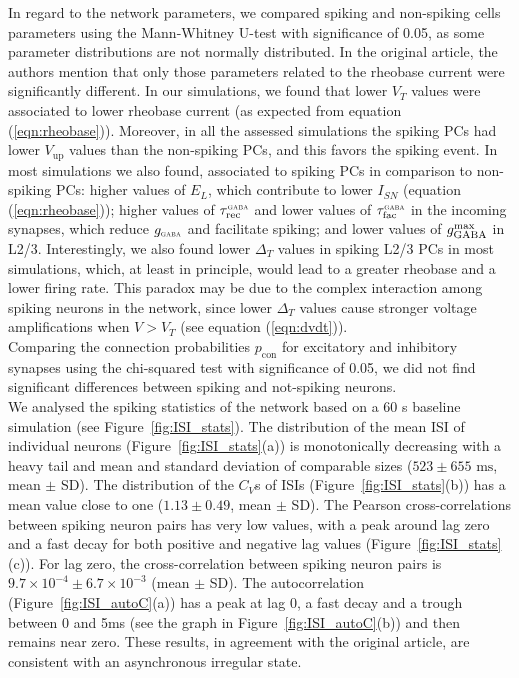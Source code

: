 In regard to the network parameters, we compared spiking and non-spiking cells parameters using the Mann-Whitney U-test with significance of 0.05, as some parameter distributions are not normally distributed. In the original article, the authors mention that only those parameters related to the rheobase current were significantly different. In our simulations, we found that lower $V_T$ values were associated to lower rheobase current (as expected from equation (\ref{eqn:rheobase})). Moreover, in all the assessed simulations the spiking PCs had lower $V_{\text{up}}$ values than the non-spiking PCs, and this favors the spiking event. In most simulations we also found, associated to spiking PCs in comparison to non-spiking PCs: higher values of $E_L$, which contribute to lower $I_{SN}$ (equation (\ref{eqn:rheobase})); higher values of $\tau_{\text{rec}}^{\scaleto{\text{GABA}}{3pt}}$ and lower values of $\tau_{\text{fac}}^{\scaleto{\text{GABA}}{3pt}}$ in the incoming synapses, which reduce $g_{\scaleto{\text{GABA}}{3pt}}$ and facilitate spiking; and lower values of $g_{\text{GABA}}^{\scaleto{\text{max}}{3pt}}$ in L2/3. Interestingly, we also found lower $\Delta_T$ values in spiking L2/3 PCs in most simulations, which, at least in principle, would lead to a greater rheobase and a lower firing rate. This paradox may be due to the complex interaction among spiking neurons in the network, since lower $\Delta_T$ values cause stronger voltage amplifications when $V > V_T$ (see equation (\ref{eqn:dvdt})).\\

Comparing the connection probabilities $p_{\text{con}}$ for excitatory and inhibitory synapses using the chi-squared test with significance of 0.05, we did not find significant differences between spiking and not-spiking neurons.\\

We analysed the spiking statistics of the network based on a 60 s baseline simulation (see Figure~\ref{fig:ISI_stats}). The distribution of the mean ISI of individual neurons (Figure~\ref{fig:ISI_stats}(a)) is monotonically decreasing with a heavy tail and mean and standard deviation of comparable sizes ($523 \pm 655 \text{ ms}$, mean $\pm$ SD). The distribution of the $C_V$s of ISIs (Figure~\ref{fig:ISI_stats}(b)) has a mean value close to one ($1.13 \pm 0.49$, mean $\pm$ SD). The Pearson cross-correlations between spiking neuron pairs has very low values, with a peak around lag zero and a fast decay for both positive and negative lag values (Figure~\ref{fig:ISI_stats}(c)). For lag zero, the cross-correlation between spiking neuron pairs is $9.7 \times 10^{-4} \pm 6.7 \times 10^{-3}$ (mean $\pm$ SD). The autocorrelation (Figure~\ref{fig:ISI_autoC}(a)) has a peak at lag 0, a fast decay and a trough between 0 and 5ms (see the graph in Figure~\ref{fig:ISI_autoC}(b)) and then remains near zero.  These results, in agreement with the original article, are consistent with an asynchronous irregular state.\\

